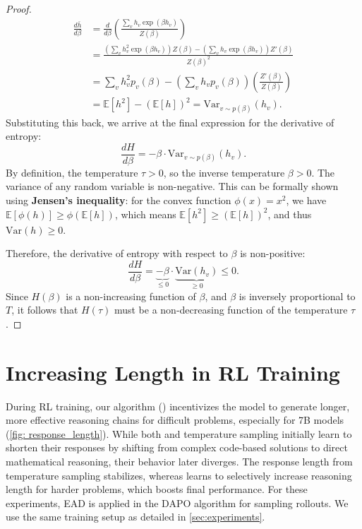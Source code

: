 \begin{proof}
\begin{align*}
\frac{d\bar{h}}{d\beta} &= \frac{d}{d\beta}\left( \frac{\sum_v h_v \exp(\beta h_v)}{Z(\beta)} \right) \\
&= \frac{(\sum_v h_v^2 \exp(\beta h_v))Z(\beta) - (\sum_v h_v \exp(\beta h_v))Z'(\beta)}{Z(\beta)^2} \\
&= \sum_v h_v^2 p_v(\beta) - \left(\sum_v h_v p_v(\beta)\right)\left(\frac{Z'(\beta)}{Z(\beta)}\right) \\
&= \mathbb{E}[h^2] - (\mathbb{E}[h])^2 = \mathrm{Var}_{v \sim p(\beta)}(h_v).
\end{align*}
Substituting this back, we arrive at the final expression for the derivative of entropy:
\[
\frac{dH}{d\beta} = -\beta \cdot \mathrm{Var}_{v \sim p(\beta)}(h_v).
\]
By definition, the temperature $\tau > 0$, so the inverse temperature $\beta > 0$. The variance of any random variable is non-negative. This can be formally shown using \textbf{Jensen's inequality}: for the convex function $\phi(x)=x^2$, we have $\mathbb{E}[\phi(h)] \ge \phi(\mathbb{E}[h])$, which means $\mathbb{E}[h^2] \ge (\mathbb{E}[h])^2$, and thus $\mathrm{Var}(h) \ge 0$.

Therefore, the derivative of entropy with respect to $\beta$ is non-positive:
\[
\frac{dH}{d\beta} = \underbrace{-\beta}_{\le 0} \cdot \underbrace{\mathrm{Var}(h_v)}_{\ge 0} \le 0.
\]
Since $H(\beta)$ is a non-increasing function of $\beta$, and $\beta$ is inversely proportional to $T$, it follows that $H(\tau)$ must be a non-decreasing function of the temperature $\tau$.
\end{proof}

\section{Increasing Length in RL Training}
\label{app: increased_length}
During RL training, our algorithm (\alg) incentivizes the model to generate longer, more effective reasoning chains for difficult problems, especially for 7B models (\cref{fig: response_length}). While both \alg and temperature sampling initially learn to shorten their responses by shifting from complex code-based solutions to direct mathematical reasoning, their behavior later diverges. The response length from temperature sampling stabilizes, whereas \alg learns to selectively increase reasoning length for harder problems, which boosts final performance. For these experiments, EAD is applied in the DAPO algorithm for sampling rollouts. We use the same training setup as detailed in \cref{sec:experiments}. 

